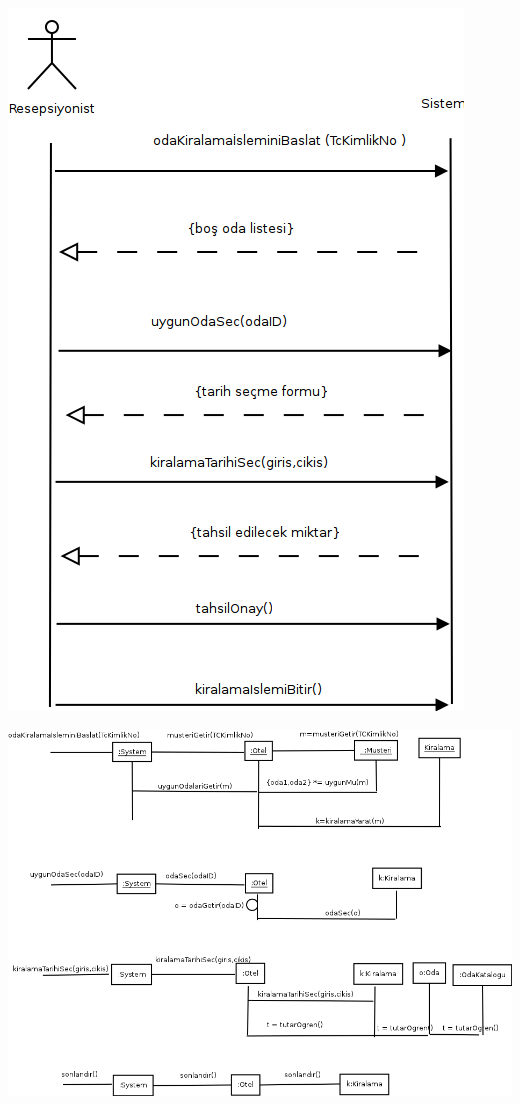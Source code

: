 \documentclass[12pt,a4paper]{report}
\begin{document}
\newpage

\begin{center}
\includegraphics{dia/ssd-usecase2.png}
\end{center}

\newpage

\begin{center}
\includegraphics{dia/eventdiagram-usecase2.png}
\end{center}
\end{document}
